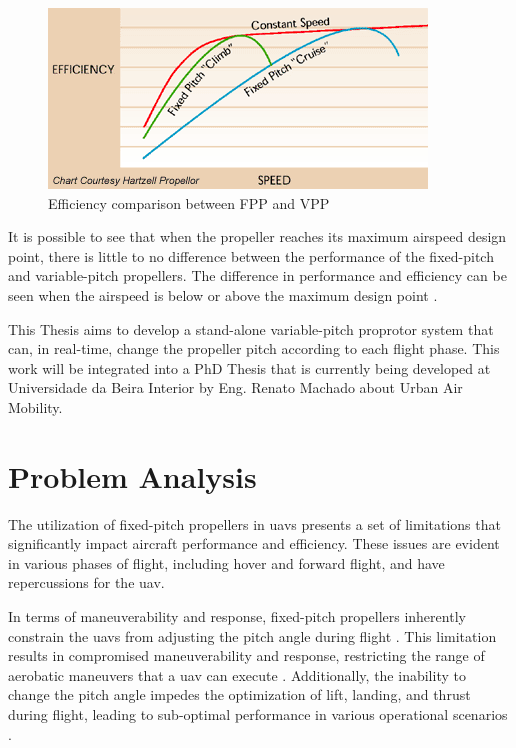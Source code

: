 \begin{figure}[H]
    \centering
    \includegraphics[scale=0.8]{ch1/assests/FPPvsVPP.png}
    \caption{Efficiency comparison between FPP and VPP \cite{VPP9}}
    \label{fig:FPPvsVPP}
\end{figure}

It is possible to see that when the propeller reaches its maximum airspeed design point, there is little to no difference between the performance of the fixed-pitch and variable-pitch propellers.
The difference in performance and efficiency can be seen when the airspeed is below or above the maximum design point \cite{VPP9}.

This Thesis aims to develop a stand-alone variable-pitch proprotor system that can, in real-time, change the propeller pitch according to each flight phase.
This work will be integrated into a PhD Thesis that is currently being developed at Universidade da Beira Interior by Eng. Renato Machado about Urban Air Mobility.


\section{Problem Analysis}
The utilization of fixed-pitch propellers in \glspl{uav} presents a set of limitations that significantly impact aircraft performance and efficiency.
These issues are evident in various phases of flight, including hover and forward flight, and have repercussions for the \gls{uav}.

In terms of maneuverability and response, fixed-pitch propellers inherently constrain the \glspl{uav} from adjusting the pitch angle during flight \cite{FPP1}.
This limitation results in compromised maneuverability and response, restricting the range of aerobatic maneuvers that a \gls{uav} can execute \cite{FPP1}.
Additionally, the inability to change the pitch angle impedes the optimization of lift, landing, and thrust during flight, leading to sub-optimal performance in various operational scenarios \cite{FPP1}.

